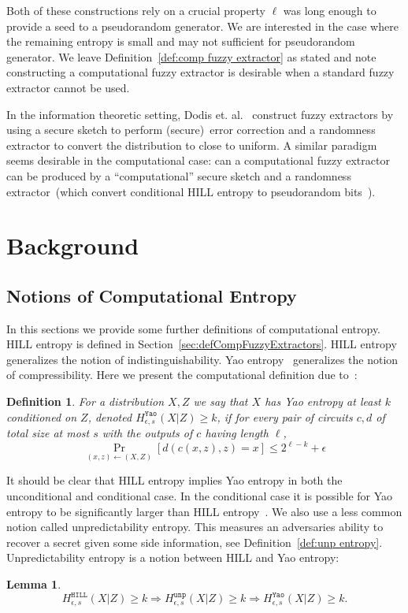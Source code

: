 \documentclass[11pt]{article}
\newcommand{\secref}[1]{\mbox{Section~\ref{#1}}}
\newcommand{\defref}[1]{\mbox{Definition~\ref{#1}}}
\newcommand{\hill}{\ensuremath{\mathtt{HILL}}\xspace}
\newcommand{\yao}{\ensuremath{\mathtt{Yao}}\xspace}
\newcommand{\unp}{\ensuremath{\mathtt{unp}}\xspace}
\newtheorem{lemma}[theorem]{Lemma}
\newtheorem{definition}[theorem]{Definition}
\begin{document}
{Both of these constructions rely on a crucial property $\ell$ was long enough to provide a seed to a pseudorandom generator.  We are interested in the case where the remaining entropy is small and may not sufficient for pseudorandom generator.  We leave Definition~\ref{def:comp fuzzy extractor} as stated and note constructing a computational fuzzy extractor is desirable when a standard fuzzy extractor cannot be used. 

In the information theoretic setting, Dodis et. al.~\cite{DBLP:journals/siamcomp/DodisORS08} construct fuzzy extractors by using a secure sketch to perform (secure)~error correction and a randomness extractor to convert the distribution to close to uniform.  A similar paradigm seems desirable in the computational case: can a computational fuzzy extractor can be produced by a ``computational'' secure sketch and a randomness extractor~(which convert conditional HILL entropy to pseudorandom bits~\cite[Lemma 5]{DBLP:conf/eurocrypt/HsiaoLR07}).
}


\appendix
\section{Background}
\subsection{Notions of Computational Entropy}
\label{sec:notionsEntropy}
In this sections we provide some further definitions of computational entropy.  HILL entropy is defined in \secref{sec:defCompFuzzyExtractors}.  HILL entropy generalizes the notion of indistinguishability.  Yao entropy~\cite{DBLP:conf/focs/Yao82a, barak-computational} generalizes the notion of compressibility.  Here we present the computational definition due to~\cite{DBLP:conf/eurocrypt/HsiaoLR07}:
\begin{definition}
\label{def:yao entropy}
For a distribution $X, Z$ we say that $X$ has Yao entropy at least $k$ conditioned on $Z$, denoted $H^{\yao}_{\epsilon, s}(X|Z)\geq k$, if for every pair of circuits $c,d$ of total size at most $s$ with the outputs of $c$ having length $\ell$,
\[
\Pr_{(x,z)\leftarrow (X,Z)}[d(c(x,z),z) = x]\leq 2^{\ell-k}+\epsilon
\]
\end{definition}
It should be clear that HILL entropy implies Yao entropy in both the unconditional and conditional case.  In the conditional case it is possible for Yao entropy to be significantly larger than HILL entropy~\cite{DBLP:conf/eurocrypt/HsiaoLR07}.  We also use a less common notion called unpredictability entropy.  This measures an adversaries ability to recover a secret given some side information, see \defref{def:unp entropy}.
Unpredictability entropy is a notion between HILL and Yao entropy:
\begin{lemma}~\cite[Lemmas 8, 9]{DBLP:conf/eurocrypt/HsiaoLR07}\label{lem:hillimplyunpimplyyao}
\[ H^{\hill}_{\epsilon, s}(X|Z)\geq k \Rightarrow H^{\unp}_{\epsilon, s}(X|Z)\geq k\Rightarrow H^{\yao}_{\epsilon, s}(X|Z)\geq k.
\]
\end{lemma} 
\end{document}
